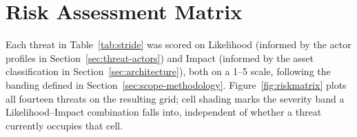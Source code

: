 \section{Risk Assessment Matrix}
\label{sec:risk-matrix}

Each threat in Table~\ref{tab:stride} was scored on Likelihood (informed by the actor profiles in Section~\ref{sec:threat-actors}) and Impact (informed by the asset classification in Section~\ref{sec:architecture}), both on a 1--5 scale, following the banding defined in Section~\ref{sec:scope-methodology}. Figure~\ref{fig:riskmatrix} plots all fourteen threats on the resulting grid; cell shading marks the severity band a Likelihood--Impact combination falls into, independent of whether a threat currently occupies that cell.

\begin{figure}[htbp]
\centering
{}
\end{figure}
